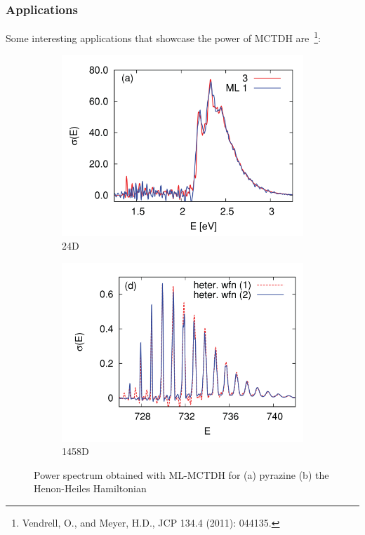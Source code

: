 \documentclass{beamer}
\begin{document}
\begin{frame}
  \frametitle{Applications}
  Some interesting applications that showcase the power of MCTDH are~\footnote{Vendrell, O., and Meyer, H.D., JCP 134.4 (2011): 044135.}:
  \begin{figure}[ht]
    \centering
     \begin{subfigure}[b]{0.4\textwidth}
         \centering
          \includegraphics[width=\textwidth]{pyra.png}
         \caption{24D}
         \label{figpyr}
     \end{subfigure}
     \begin{subfigure}[b]{0.4\textwidth}
         \centering
         \includegraphics[width=\textwidth]{hh.png}
         \caption{1458D}
         \label{fighh}
     \end{subfigure}
    \caption{Power spectrum obtained with ML-MCTDH for (a) pyrazine (b) the Henon-Heiles Hamiltonian}\label{figapl}
  \end{figure}

  
\end{frame}
\end{document}
